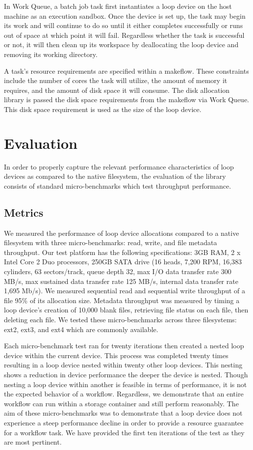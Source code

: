 \documentclass[conference]{IEEEtran}
\begin{document}
In Work Queue, a batch job task first instantiates a loop device on the host machine as an execution sandbox. Once the device is set up, the task may begin its work and will continue to do so until it either completes successfully or runs out of space at which point it will fail. Regardless whether the task is successful or not, it will then clean up its workspace by deallocating the loop device and removing its working directory.

A task's resource requirements are specified within a makeflow. These constraints include the number of cores the task will utilize, the amount of memory it requires, and the amount of disk space it will consume. The disk allocation library is passed the disk space requirements from the makeflow via Work Queue. This disk space requirement is used as the size of the loop device.

\section{Evaluation}
In order to properly capture the relevant performance characteristics of loop devices as compared to the native filesystem, the evaluation of the library consists of standard micro-benchmarks which test throughput performance.

\subsection{Metrics}
We measured the performance of loop device allocations compared to a native filesystem with three micro-benchmarks: read, write, and file metadata throughput. Our test platform has the following specifications: 3GB RAM, 2 x Intel Core 2 Duo processors, 250GB SATA drive (16 heads, 7,200 RPM, 16,383 cylinders, 63 sectors/track, queue depth 32, max I/O data transfer rate 300 MB/s, max sustained data transfer rate 125 MB/s, internal data transfer rate 1,695 Mb/s). We measured sequential read and sequential write throughput of a file 95\% of its allocation size. Metadata throughput was measured by timing a loop device's creation of 10,000 blank files, retrieving file status on each file, then deleting each file. We tested these micro-benchmarks across three filesystems: ext2, ext3, and ext4 which are commonly available. 

Each micro-benchmark test ran for twenty iterations then created a nested loop device within the current device. This process was completed twenty times resulting in a loop device nested within twenty other loop devices. This nesting shows a reduction in device performance the deeper the device is nested. Though nesting a loop device within another is feasible in terms of performance, it is not the expected behavior of a workflow. Regardless, we demonstrate that an entire workflow can run within a storage container and still perform reasonably. The aim of these micro-benchmarks was to demonstrate that a loop device does not experience a steep performance decline in order to provide a resource guarantee for a workflow task. We have provided the first ten iterations of the test as they are most pertinent.
\end{document}
